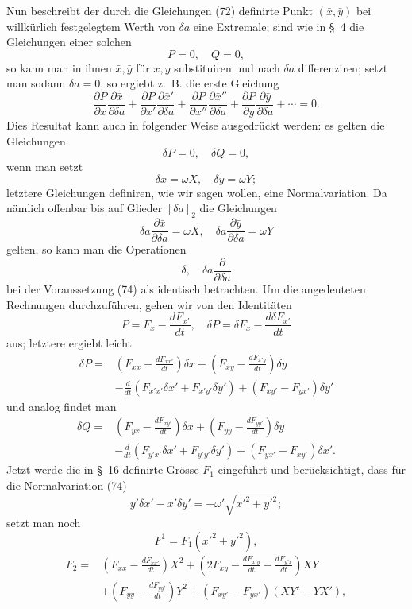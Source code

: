 \documentclass[11pt,a4paper,leqno]{article}
\begin{document}
Nun beschreibt der durch die Gleichungen (72) definirte Punkt $(\bar x,\bar y)$ bei willkürlich festgelegtem Werth von $\delta a$ eine Extremale; sind wie in \S~4 die Gleichungen einer solchen
\[
P=0,\quad Q=0,
\]
so kann man in ihnen $\bar x,\bar y$ für $x,y$ substituiren und nach $\delta a$ differenziren; setzt man sodann $\delta a=0$, so ergiebt z.~B. die erste Gleichung
\[
\frac{\partial P}{\partial x}\frac{\partial\bar x}{\partial\delta a}
+\frac{\partial P}{\partial x'}\frac{\partial\bar x'}{\partial\delta a}
+\frac{\partial P}{\partial x''}\frac{\partial\bar x''}{\partial\delta a}
+\frac{\partial P}{\partial y}\frac{\partial\bar y}{\partial\delta a}+\cdots=0.
\]
Dies Resultat kann auch in folgender Weise ausgedrückt werden: es gelten die Gleichungen
\[
\delta P=0,\quad \delta Q=0,
\]
wenn man setzt
\begin{equation}\tag{74}
\delta x=\omega X,
\quad
\delta y=\omega Y;
\end{equation}
letztere Gleichungen definiren, wie wir sagen wollen, eine Normalvariation. Da nämlich offenbar bis auf Glieder $[\delta a]_2$ die Gleichungen
\[
\delta a\frac{\partial\bar x}{\partial\delta a}=\omega X,
\quad
\delta a\frac{\partial\bar y}{\partial\delta a}=\omega Y
\]
gelten, so kann man die Operationen
\[
\delta,\quad \delta a\frac{\partial}{\partial\delta a}
\]
bei der Voraussetzung (74) als identisch betrachten. Um die angedeuteten Rechnungen durchzuführen, gehen wir von den Identitäten
\[
P=F_x-\frac{dF_{x'}}{dt},\quad
\delta P=\delta F_x-\frac{d\delta F_{x'}}{dt}
\]
aus; letztere ergiebt leicht
\[
\begin{aligned}
\delta P={}&\left(F_{xx}-\frac{dF_{xx'}}{dt}\right)\delta x
+\left(F_{xy}-\frac{dF_{x'y}}{dt}\right)\delta y\\
&-\frac{d}{dt}(F_{x'x'}\delta x'+F_{x'y'}\delta y')
+(F_{xy'}-F_{yx'})\delta y'
\end{aligned}
\]
und analog findet man
\[
\begin{aligned}
\delta Q={}&\left(F_{yx}-\frac{dF_{xy'}}{dt}\right)\delta x
+\left(F_{yy}-\frac{dF_{yy'}}{dt}\right)\delta y\\
&-\frac{d}{dt}(F_{y'x'}\delta x'+F_{y'y'}\delta y')
+(F_{yx'}-F_{xy'})\delta x'.
\end{aligned}
\]
Jetzt werde die in \S~16 definirte Grösse $F_1$ eingeführt und berücksichtigt, dass für die Normalvariation (74)
\[
y'\delta x'-x'\delta y'=-\omega'\sqrt{x'^2+y'^2};
\]
setzt man noch
\[
F^1=F_1(x'^2+y'^2),
\]
\[
\begin{aligned}
F_2={}&\left(F_{xx}-\frac{dF_{xx'}}{dt}\right)X^2
+\left(2F_{xy}-\frac{dF_{x'y}}{dt}-\frac{dF_{y'x}}{dt}\right)XY\\
&+\left(F_{yy}-\frac{dF_{yy'}}{dt}\right)Y^2
+(F_{xy'}-F_{yx'})(XY'-YX'),
\end{aligned}
\]
\end{document}
